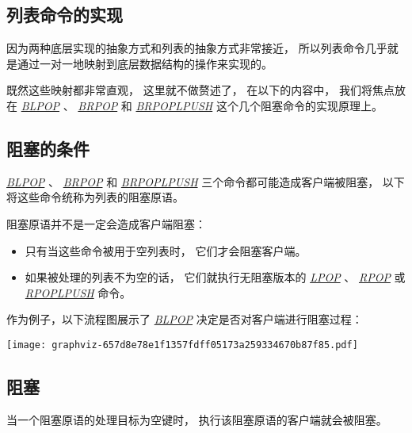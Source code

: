 \documentclass[a4paper,11pt,english]{sphinxmanual}
\begin{document}
\subsection{列表命令的实现}
\label{datatype/list:id3}
因为两种底层实现的抽象方式和列表的抽象方式非常接近，
所以列表命令几乎就是通过一对一地映射到底层数据结构的操作来实现的。

既然这些映射都非常直观，
这里就不做赘述了，
在以下的内容中，
我们将焦点放在 \href{http://redis.readthedocs.org/en/latest/list/blpop.html\#blpop}{\emph{BLPOP}} 、 \href{http://redis.readthedocs.org/en/latest/list/brpop.html\#brpop}{\emph{BRPOP}} 和 \href{http://redis.readthedocs.org/en/latest/list/brpoplpush.html\#brpoplpush}{\emph{BRPOPLPUSH}} 这个几个阻塞命令的实现原理上。


\subsection{阻塞的条件}
\label{datatype/list:id4}
\href{http://redis.readthedocs.org/en/latest/list/blpop.html\#blpop}{\emph{BLPOP}} 、 \href{http://redis.readthedocs.org/en/latest/list/brpop.html\#brpop}{\emph{BRPOP}} 和 \href{http://redis.readthedocs.org/en/latest/list/brpoplpush.html\#brpoplpush}{\emph{BRPOPLPUSH}} 三个命令都可能造成客户端被阻塞，
以下将这些命令统称为列表的阻塞原语。

阻塞原语并不是一定会造成客户端阻塞：
\begin{itemize}
\item {} 
只有当这些命令被用于空列表时， 它们才会阻塞客户端。

\item {} 
如果被处理的列表不为空的话， 它们就执行无阻塞版本的 \href{http://redis.readthedocs.org/en/latest/list/lpop.html\#lpop}{\emph{LPOP}} 、 \href{http://redis.readthedocs.org/en/latest/list/rpop.html\#rpop}{\emph{RPOP}} 或 \href{http://redis.readthedocs.org/en/latest/list/rpoplpush.html\#rpoplpush}{\emph{RPOPLPUSH}} 命令。

\end{itemize}

作为例子，以下流程图展示了 \href{http://redis.readthedocs.org/en/latest/list/blpop.html\#blpop}{\emph{BLPOP}} 决定是否对客户端进行阻塞过程：

\texttt{[image: graphviz-657d8e78e1f1357fdff05173a259334670b87f85.pdf]}


\subsection{阻塞}
\label{datatype/list:id5}
当一个阻塞原语的处理目标为空键时，
执行该阻塞原语的客户端就会被阻塞。
\end{document}
